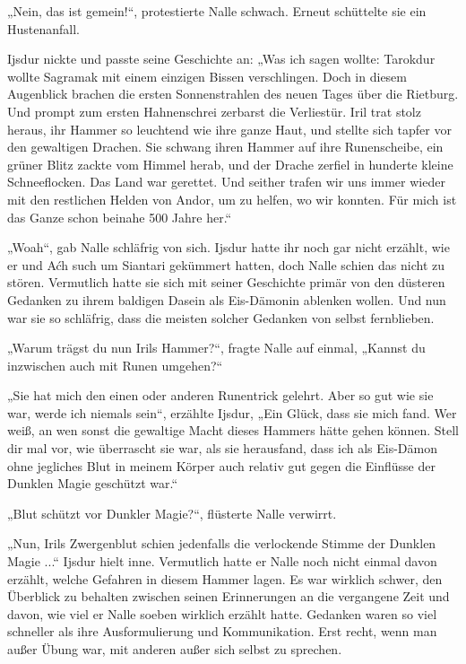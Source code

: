 „Nein, das ist gemein!“, protestierte Nalle schwach. Erneut schüttelte sie ein Hustenanfall.

Ijsdur nickte und passte seine Geschichte an: „Was ich sagen wollte: Tarokdur wollte Sagramak mit einem einzigen Bissen verschlingen. Doch in diesem Augenblick brachen die ersten Sonnenstrahlen des neuen Tages über die Rietburg. Und prompt zum ersten Hahnenschrei zerbarst die Verliestür. Iril trat stolz heraus, ihr Hammer so leuchtend wie ihre ganze Haut, und stellte sich tapfer vor den gewaltigen Drachen. Sie schwang ihren Hammer auf ihre Runenscheibe, ein grüner Blitz zackte vom Himmel herab, und der Drache zerfiel in hunderte kleine Schneeflocken. Das Land war gerettet. Und seither trafen wir uns immer wieder mit den restlichen Helden von Andor, um zu helfen, wo wir konnten. Für mich ist das Ganze schon beinahe 500 Jahre her.“

„Woah“, gab Nalle schläfrig von sich. Ijsdur hatte ihr noch gar nicht erzählt, wie er und Aćh such um Siantari gekümmert hatten, doch Nalle schien das nicht zu stören. Vermutlich hatte sie sich mit seiner Geschichte primär von den düsteren Gedanken zu ihrem baldigen Dasein als Eis-Dämonin ablenken wollen. Und nun war sie so schläfrig, dass die meisten solcher Gedanken von selbst fernblieben.

„Warum trägst du nun Irils Hammer?“, fragte Nalle auf einmal, „Kannst du inzwischen auch mit Runen umgehen?“

„Sie hat mich den einen oder anderen Runentrick gelehrt. Aber so gut wie sie war, werde ich niemals sein“, erzählte Ijsdur, „Ein Glück, dass sie mich fand. Wer weiß, an wen sonst die gewaltige Macht dieses Hammers hätte gehen können. Stell dir mal vor, wie überrascht sie war, als sie herausfand, dass ich als Eis-Dämon ohne jegliches Blut in meinem Körper auch relativ gut gegen die Einflüsse der Dunklen Magie geschützt war.“

„Blut schützt vor Dunkler Magie?“, flüsterte Nalle verwirrt.

„Nun, Irils Zwergenblut schien jedenfalls die verlockende Stimme der Dunklen Magie ...“ Ijsdur hielt inne. Vermutlich hatte er Nalle noch nicht einmal davon erzählt, welche Gefahren in diesem Hammer lagen. Es war wirklich schwer, den Überblick zu behalten zwischen seinen Erinnerungen an die vergangene Zeit und davon, wie viel er Nalle soeben wirklich erzählt hatte. Gedanken waren so viel schneller als ihre Ausformulierung und Kommunikation. Erst recht, wenn man außer Übung war, mit anderen außer sich selbst zu sprechen.

